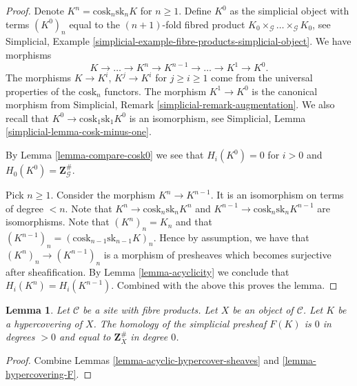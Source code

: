 \documentclass{stacks-project}
\theoremstyle{plain}
\newtheorem{lemma}[subsection]{Lemma}
\theoremstyle{definition}
\theoremstyle{remark}
\numberwithin{equation}{subsection}
\begin{document}
\begin{proof}
Denote $K^n = \text{cosk}_n \text{sk}_n K$ for $n \geq 1$.
Define $K^0$ as the simplicial object with terms
$(K^0)_n$ equal to the $(n + 1)$-fold fibred product
$K_0 \times_\mathcal{G} \ldots \times_\mathcal{G} K_0$,
see Simplicial,
Example \ref{simplicial-example-fibre-products-simplicial-object}.
We have morphisms
$$
K \longrightarrow \ldots \to K^n \to K^{n - 1} \to \ldots \to K^1 \to K^0.
$$
The morphisms $K \to K^i$, $K^j \to K^i$ for $j \geq i \geq 1$ come
from the universal properties of the $\text{cosk}_n$ functors.
The morphism $K^1 \to K^0$ is the canonical morphism
from
Simplicial, Remark \ref{simplicial-remark-augmentation}.
We also recall that $K^0 \to \text{cosk}_1 \text{sk}_1 K^0$
is an isomorphism, see
Simplicial, Lemma \ref{simplicial-lemma-cosk-minus-one}.

\medskip\noindent
By Lemma \ref{lemma-compare-cosk0} we see that
$H_i(K^0) = 0$ for $i > 0$ and $H_0(K^0) = \mathbf{Z}_\mathcal{G}^\#$.

\medskip\noindent
Pick $n \geq 1$. Consider the morphism $K^n \to K^{n - 1}$.
It is an isomorphism on terms of degree $< n$.
Note that $K^n \to \text{cosk}_n \text{sk}_n K^n$ and
$K^{n - 1} \to \text{cosk}_n \text{sk}_n K^{n - 1}$
are isomorphisms. Note that $(K^n)_n = K_n$ and
that $(K^{n - 1})_n = (\text{cosk}_{n - 1} \text{sk}_{n - 1} K)_n$.
Hence by assumption, we have that $(K^n)_n \to (K^{n - 1})_n$
is a morphism of presheaves which becomes surjective after
sheafification. By Lemma \ref{lemma-acyclicity} we conclude that
$H_i(K^n) = H_i(K^{n - 1})$.
Combined with the above this proves the lemma.
\end{proof}

\begin{lemma}
\label{lemma-hypercovering-acyclic}
Let $\mathcal{C}$ be a site with fibre products.
Let $X$ be an object of $\mathcal{C}$.
Let $K$ be a hypercovering of $X$.
The homology of the simplicial presheaf $F(K)$ is
$0$ in degrees $> 0$ and equal to $\mathbf{Z}_X^\#$
in degree $0$.
\end{lemma}

\begin{proof}
Combine Lemmas \ref{lemma-acyclic-hypercover-sheaves}
and \ref{lemma-hypercovering-F}.
\end{proof}
\end{document}
